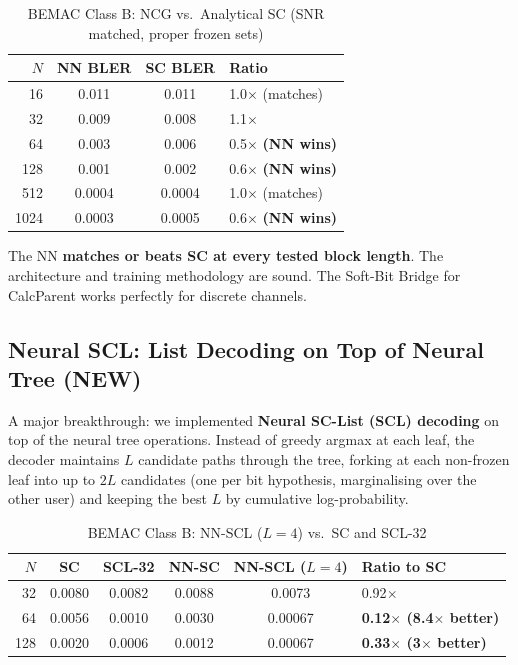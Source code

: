 \documentclass[10pt]{article}
\begin{document}
\begin{table}[H]
\centering
\caption{BEMAC Class B: NCG vs.\ Analytical SC (SNR matched, proper frozen sets)}
\label{tab:bemac}
\begin{tabular}{@{}rccl@{}}
\toprule
$N$ & NN BLER & SC BLER & Ratio \\
\midrule
16  & 0.011  & 0.011  & 1.0$\times$ (matches) \\
32  & 0.009  & 0.008  & 1.1$\times$ \\
64  & 0.003  & 0.006  & 0.5$\times$ \textbf{(NN wins)} \\
128 & 0.001  & 0.002  & 0.6$\times$ \textbf{(NN wins)} \\
512 & 0.0004 & 0.0004 & 1.0$\times$ (matches) \\
1024 & 0.0003 & 0.0005 & 0.6$\times$ \textbf{(NN wins)} \\
\bottomrule
\end{tabular}
\end{table}

The NN \textbf{matches or beats SC at every tested block length}. The architecture and training methodology are sound. The Soft-Bit Bridge for CalcParent works perfectly for discrete channels.

\subsection{Neural SCL: List Decoding on Top of Neural Tree (NEW)}

A major breakthrough: we implemented \textbf{Neural SC-List (SCL) decoding} on top of the neural tree operations. Instead of greedy argmax at each leaf, the decoder maintains $L$ candidate paths through the tree, forking at each non-frozen leaf into up to $2L$ candidates (one per bit hypothesis, marginalising over the other user) and keeping the best $L$ by cumulative log-probability.

\begin{table}[H]
\centering
\caption{BEMAC Class B: NN-SCL ($L = 4$) vs.\ SC and SCL-32}
\label{tab:bemac-scl}
\begin{tabular}{@{}rccccl@{}}
\toprule
$N$ & SC & SCL-32 & NN-SC & NN-SCL ($L\!=\!4$) & Ratio to SC \\
\midrule
32  & 0.0080 & 0.0082 & 0.0088 & 0.0073 & 0.92$\times$ \\
64  & 0.0056 & 0.0010 & 0.0030 & 0.00067 & \textbf{0.12$\times$ (8.4$\times$ better)} \\
128 & 0.0020 & 0.0006 & 0.0012 & 0.00067 & \textbf{0.33$\times$ (3$\times$ better)} \\
\bottomrule
\end{tabular}
\end{table}
\end{document}

